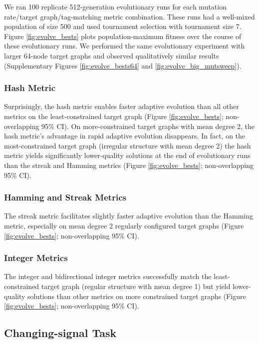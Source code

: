 We ran 100 replicate 512-generation evolutionary runs for each mutation rate/target graph/tag-matching metric combination.
These runs had a well-mixed population of size 500 and used tournament selection with tournament size 7.
Figure \ref{fig:evolve_bests} plots population-maximum fitness over the course of these evolutionary runs.
We performed the same evolutionary experiment with larger 64-node target graphs and observed qualitatively similar results (Supplementary Figures \ref{fig:evolve_bests64} and \ref{fig:evolve_big_mutsweep}).

\subsubsection{Hash Metric}

Surprisingly, the hash metric enables faster adaptive evolution than all other metrics on the least-constrained target graph (Figure \ref{fig:evolve_bests}; non-overlapping 95\% CI).
On more-constrained target graphs with mean degree 2, the hash metric's advantage in rapid adaptive evolution disappears.
In fact, on the most-constrained target graph (irregular structure with mean degree 2) the hash metric yields significantly lower-quality solutions at the end of evolutionary runs than the streak and Hamming metrics (Figure \ref{fig:evolve_bests}; non-overlapping 95\% CI).

\subsubsection{Hamming and Streak Metrics}

The streak metric facilitates slightly faster adaptive evolution than the Hamming metric, especially on mean degree 2 regularly configured target graphs (Figure \ref{fig:evolve_bests}; non-overlapping 95\% CI).

\subsubsection{Integer Metrics}

The integer and bidirectional integer metrics successfully match the least-constrained target graph (regular structure with mean degree 1) but yield lower-quality solutions than other metrics on more constrained target graphs (Figure \ref{fig:evolve_bests}; non-overlapping 95\% CI).


\subsection{Changing-signal Task} \label{sec:changing-signal}

